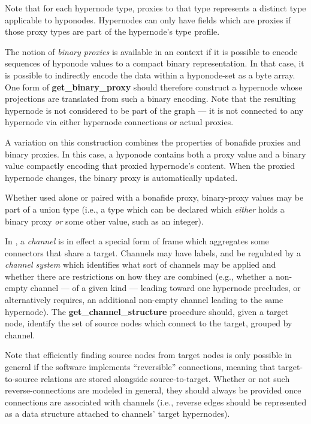 \documentclass[12pt,letterpaper]{article}
\newcommand{\procitem}[1]{{#1}}
\newcommand{\dprocitem}[1]{{\color{black!60}\textbf{#1}}}
\newcommand{\HGDM}{\resizebox{!}{7.5pt}{\ATexttclr{HGDM}}}
\newcommand{\ATexttclr}[1]{\textcolor{tcolor}{\textbf{#1}}}
\newcommand{\q}[1]{{\fontfamily{qcr}\selectfont ``}#1{\fontfamily{qcr}\selectfont ''}}
\begin{document}
{{\begin{description}
\descindent{}  Note that for each hypernode type, proxies 
to that type represents a distinct type applicable to 
hyponodes.  Hypernodes can only have fields which are 
proxies if those proxy types are part of the hypernode's 
type profile.

\item[\procitem{get\_binary\_proxy(...)}]  The 
notion of \textit{binary proxies} is available in 
an \HGDM{} context if it is possible to encode 
sequences of hyponode values to a compact binary 
representation.  In that case, it is possible to 
indirectly encode the data within a hyponode-set 
as a byte array.  One form of \dprocitem{get\_binary\_proxy} 
should therefore construct a hypernode whose projections 
are translated from such a binary encoding.  Note that 
the resulting hypernode is not considered to be part of 
the graph --- it is not connected to any hypernode 
via either hypernode connections or actual proxies.

\descindent{}  A variation on this construction 
combines the properties of bonafide proxies and 
binary proxies.  In this case, a hyponode contains 
both a proxy value and a binary value compactly 
encoding that proxied hypernode's content.  When 
the proxied hypernode changes, the binary proxy 
is automatically updated.  

\descindent{}  Whether used alone or paired with a 
bonafide proxy, binary-proxy values may be 
part of a union type (i.e., a type which can be 
declared which \textit{either} holds a 
binary proxy \textit{or} some other value, such as an integer).    
    
\item[\procitem{get\_channel\_structure(...)}]  In \HGDM{}, 
a \textit{channel} is in effect a special form of 
frame which aggregates some connectors that share a target.  
Channels may have labels, and be regulated by a 
\textit{channel system} which identifies what sort of 
channels may be applied and whether there are restrictions 
on how they are combined (e.g., whether a non-empty channel --- 
of a given kind --- leading toward one hypernode precludes, or alternatively 
requires, an additional non-empty channel leading to 
the same hypernode).  The \dprocitem{get\_channel\_structure} 
procedure should, given a target node, identify the set of 
source nodes which connect to the target, grouped by channel.

\descindent{}  Note that efficiently finding source nodes 
from target nodes is only possible in general if 
the \HGDM{} software implements \q{reversible} connections, 
meaning that target-to-source relations are stored alongside  
source-to-target.  Whether or not such reverse-connections 
are modeled in general, they should always be provided 
once connections are associated with channels (i.e., reverse 
edges should be represented as a data structure attached 
to channels' target hypernodes).
     

\end{description}}}
\end{document}
